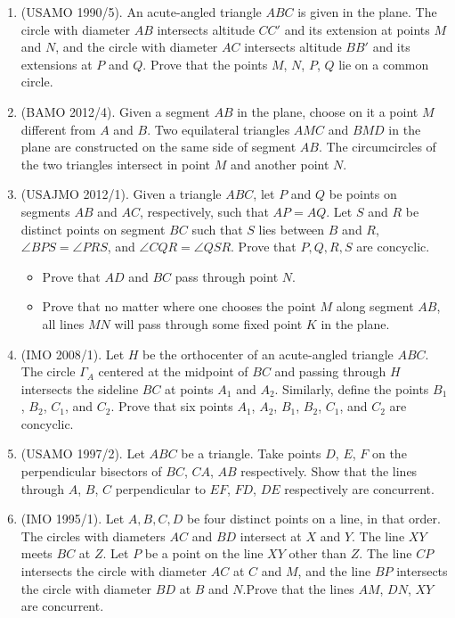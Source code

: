 \documentclass[12pt]{scrartcl}
\begin{document}
\begin{enumerate}
    \item (USAMO 1990/5). An acute-angled triangle $ABC$ is given in the plane. The circle with diameter $AB$ intersects altitude $CC'$ and its extension at points $M$ and $N$, and the circle with diameter $AC$ intersects altitude $BB'$ and its extensions at $P$ and $Q$. Prove that the points $M$, $N$, $P$, $Q$ lie on a common circle.
    
    \item (BAMO 2012/4). Given a segment $AB$ in the plane, choose on it a point $M$ different from $A$ and $B$. Two equilateral triangles $AMC$ and $BMD$ in the plane are constructed on the same side of segment $AB$. The circumcircles of the two triangles intersect in point $M$ and another point $N$.
    
    \item (USAJMO 2012/1). Given a triangle $ABC$, let $P$ and $Q$ be points on segments $AB$ and $AC$, respectively, such that $AP = AQ$. Let $S$ and $R$ be distinct points on segment $BC$ such that $S$ lies between $B$ and $R$, $\angle BPS = \angle PRS$, and $\angle CQR = \angle QSR$. Prove that $P, Q, R, S$ are concyclic.
    \begin{itemize}[(a)]
            \item  Prove that $AD$ and $BC$ pass through point $N$.
            \item  Prove that no matter where one chooses the point $M$ along segment $AB$, all lines $MN$ will pass through some fixed point $K$ in the plane.
    \end{itemize}
    
    \item (IMO 2008/1). Let $H$ be the orthocenter of an acute-angled triangle $ABC$. The circle $\Gamma_A$ centered at the midpoint of $BC$ and passing through $H$ intersects the sideline $BC$ at points $A_1$ and $A_2$. Similarly, define the points $B_1$, $B_2$, $C_1$, and $C_2$. Prove that six points $A_1$, $A_2$, $B_1$, $B_2$, $C_1$, and $C_2$ are concyclic.
    
    \item (USAMO 1997/2). Let $ABC$ be a triangle. Take points $D$, $E$, $F$ on the perpendicular bisectors of $BC$, $CA$, $AB$ respectively. Show that the lines through $A$, $B$, $C$ perpendicular to $EF$, $FD$, $DE$ respectively are concurrent.
    
    \item (IMO 1995/1). Let $A, B, C, D$ be four distinct points on a line, in that order. The circles with diameters $AC$ and $BD$ intersect at $X$ and $Y$. The line $XY$ meets $BC$ at $Z$. Let $P$ be a point on the line $XY$ other than $Z$. The line $CP$ intersects the circle with diameter $AC$ at $C$ and $M$, and the line $BP$ intersects the circle with diameter $BD$ at $B$ and $N$.Prove that the lines $AM$, $DN$, $XY$ are concurrent.
    

\end{enumerate}
\end{document}

